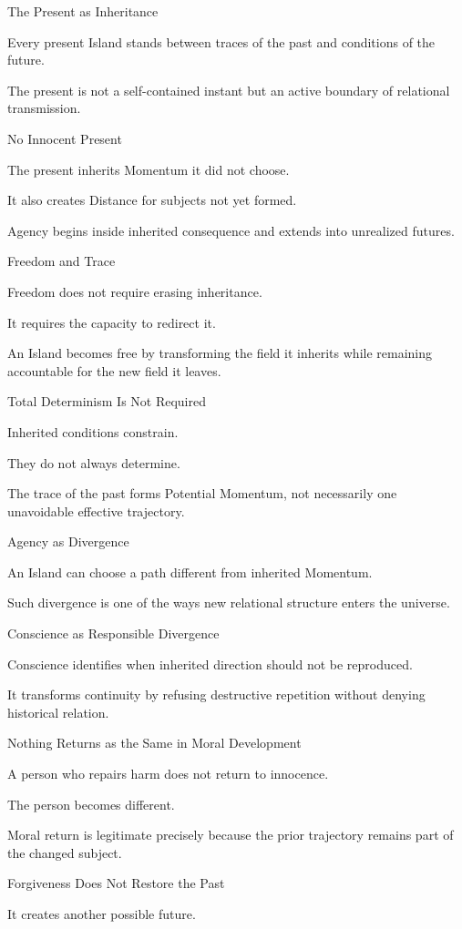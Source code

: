 The Present as Inheritance

Every present Island stands between traces of the past and conditions of the future.

The present is not a self-contained instant but an active boundary of relational transmission.

No Innocent Present

The present inherits Momentum it did not choose.

It also creates Distance for subjects not yet formed.

Agency begins inside inherited consequence and extends into unrealized futures.

Freedom and Trace

Freedom does not require erasing inheritance.

It requires the capacity to redirect it.

An Island becomes free by transforming the field it inherits while remaining accountable for the new field it leaves.

Total Determinism Is Not Required

Inherited conditions constrain.

They do not always determine.

The trace of the past forms Potential Momentum, not necessarily one unavoidable effective trajectory.

Agency as Divergence

An Island can choose a path different from inherited Momentum.

Such divergence is one of the ways new relational structure enters the universe.

Conscience as Responsible Divergence

Conscience identifies when inherited direction should not be reproduced.

It transforms continuity by refusing destructive repetition without denying historical relation.

Nothing Returns as the Same in Moral Development

A person who repairs harm does not return to innocence.

The person becomes different.

Moral return is legitimate precisely because the prior trajectory remains part of the changed subject.

Forgiveness Does Not Restore the Past

It creates another possible future.

